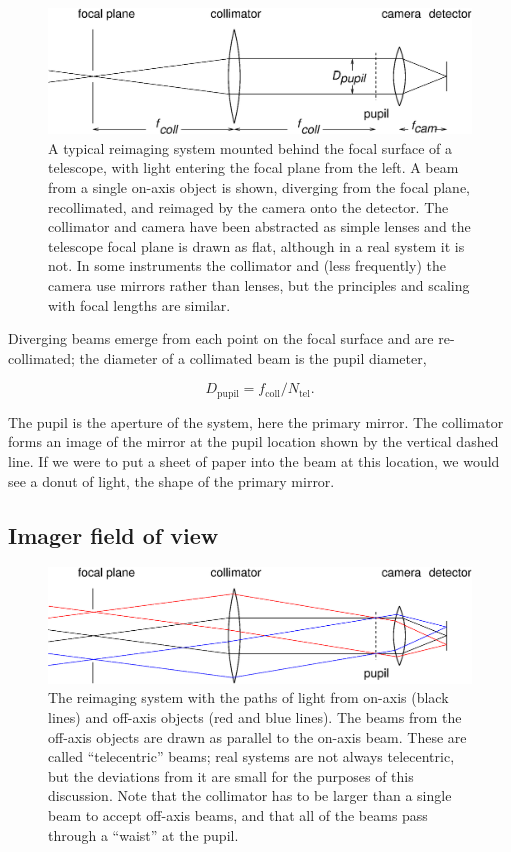 \documentclass[12pt]{article}
\begin{document}
\begin{figure}[ht]
\centerline{
\includegraphics[width=5.5truein]{onaxisbeam2.eps}
}
\caption{A typical reimaging system mounted behind the
focal surface of a telescope, with light entering the
focal plane from the left.  A beam from a single on-axis
object is shown, diverging from the focal plane, recollimated,
and reimaged by the camera onto the detector.
The collimator and camera
have been abstracted as simple lenses and the telescope focal plane
is drawn as flat, although in a real system it is not.
In some instruments the collimator and (less frequently) the
camera use mirrors rather than lenses, but the principles
and scaling with focal lengths are similar.
}
\label{fig-reimager}
\end{figure}

Diverging beams emerge from each point on the focal surface
and are re-collimated; the diameter of a collimated beam is
the pupil diameter,

$$ D_{\mathrm{pupil}} = f_{\mathrm{coll}} / N_{\mathrm{tel}}.$$

The pupil is the aperture of the system, here the primary mirror.
The collimator forms an image of the mirror at the pupil location
shown by the vertical dashed line.  If we were to put a sheet
of paper into the beam at this location, we would see a donut
of light, the shape of the primary mirror.

\subsection{Imager field of view}

\begin{figure}[ht]
\centerline{
\includegraphics[width=5.5truein]{offaxisbeams.eps}
}
\caption{The reimaging system with the paths of light
from on-axis (black lines) and off-axis objects (red and blue lines).  The 
beams from the off-axis objects are drawn as parallel
to the on-axis beam.  These are called ``telecentric'' beams;
real systems are not always telecentric, but the deviations
from it are small for the purposes of this discussion.
Note that the collimator has to be larger than a single 
beam to accept off-axis beams, and that all of the beams
pass through a ``waist'' at the pupil.  
}
\label{fig-offaxis}
\end{figure}
\end{document}
